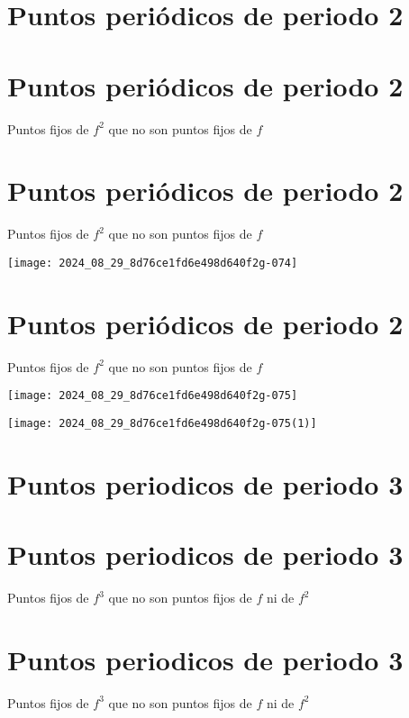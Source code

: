 \documentclass[11pt]{beamer}
\begin{document}
\section*{Puntos periódicos de periodo 2}
\section*{Puntos periódicos de periodo 2}
Puntos fijos de $f^{2}$ que no son puntos fijos de $f$

\section*{Puntos periódicos de periodo 2}
Puntos fijos de $f^{2}$ que no son puntos fijos de $f$

\begin{center}
\texttt{[image: 2024\_08\_29\_8d76ce1fd6e498d640f2g-074]}
\end{center}

\section*{Puntos periódicos de periodo 2}
Puntos fijos de $f^{2}$ que no son puntos fijos de $f$

\begin{center}
\texttt{[image: 2024\_08\_29\_8d76ce1fd6e498d640f2g-075]}
\end{center}

\begin{center}
\texttt{[image: 2024\_08\_29\_8d76ce1fd6e498d640f2g-075(1)]}
\end{center}

\section*{Puntos periodicos de periodo 3}
\section*{Puntos periodicos de periodo 3}
Puntos fijos de $f^{3}$ que no son puntos fijos de $f$ ni de $f^{2}$

\section*{Puntos periodicos de periodo 3}
Puntos fijos de $f^{3}$ que no son puntos fijos de $f$ ni de $f^{2}$
\end{document}
